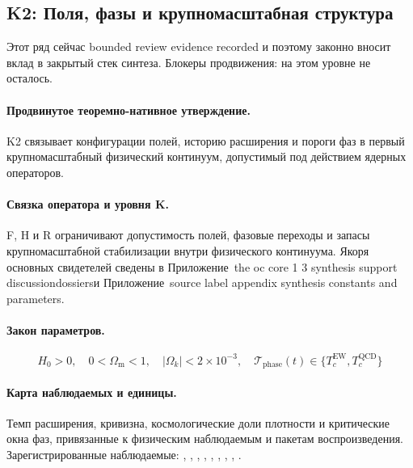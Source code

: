 \subsection{K2: Поля, фазы и крупномасштабная структура}
\label{sec:oc-core-1-3-synthesis-k2}
Этот ряд сейчас bounded review evidence recorded и поэтому законно вносит вклад в закрытый стек синтеза.
Блокеры продвижения: на этом уровне не осталось.

\paragraph{Продвинутое теоремно-нативное утверждение.}
K2 связывает конфигурации полей, историю расширения и пороги фаз в первый крупномасштабный физический континуум, допустимый под действием ядерных операторов.

\paragraph{Связка оператора и уровня K.}
F, H и R ограничивают допустимость полей, фазовые переходы и запасы крупномасштабной стабилизации внутри физического континуума.
Якоря основных свидетелей сведены в Приложение~the oc core 1 3 synthesis support discussiondossiersи Приложение~source label appendix synthesis constants and parameters.

\paragraph{Закон параметров.}
\[
H_0 > 0,\quad 0 < \Omega_{\mathrm{m}} < 1,\quad |\Omega_k| < 2 \times 10^{-3},\quad \mathcal{T}_{\mathrm{phase}}(t) \in \{T_c^{\mathrm{EW}}, T_c^{\mathrm{QCD}}\}
\]

\paragraph{Карта наблюдаемых и единицы.}
Темп расширения, кривизна, космологические доли плотности и критические окна фаз, привязанные к физическим наблюдаемым и пакетам воспроизведения.
Зарегистрированные наблюдаемые: , \allowbreak {}, \allowbreak {}, \allowbreak {}, \allowbreak {}, \allowbreak {}, \allowbreak {}, \allowbreak {}, \allowbreak {}.

